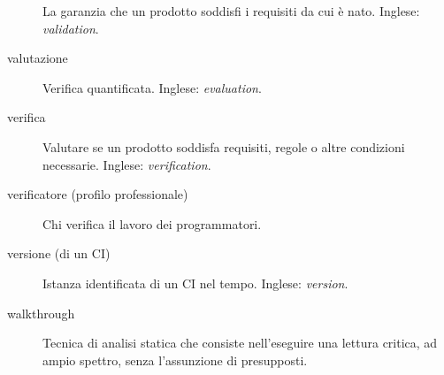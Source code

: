 \documentclass[a4paper]{article}
\begin{document}
\begin{description}
			La garanzia che un prodotto soddisfi i requisiti da cui è nato. Inglese: \emph{validation}.
			
	\item[valutazione] 

			Verifica quantificata. Inglese: \emph{evaluation}.
			
	\item[verifica] 

			Valutare se un prodotto soddisfa requisiti, regole o altre condizioni necessarie. Inglese: \emph{verification}.
			
	\item[verificatore (profilo professionale)] 

			Chi verifica il lavoro dei programmatori.
			
	\item[versione (di un CI)] 

			Istanza identificata di un CI nel tempo. Inglese: \emph{version}.
			
	\item[walkthrough] 

			Tecnica di analisi statica che consiste nell'eseguire una lettura critica, ad ampio spettro, senza l'assunzione di presupposti.
		
	\end{description}

	


\nocite{*}
\end{document}
